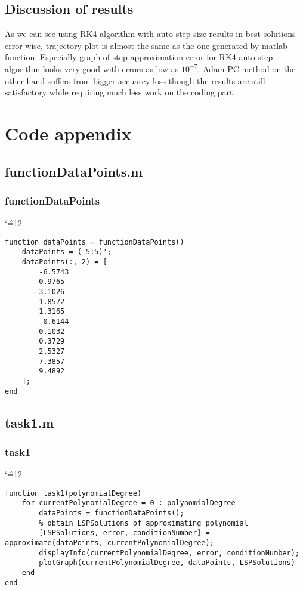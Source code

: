 \documentclass[12pt]{report}
\newenvironment{simplechar}{%
   \catcode`\^=12
}{}
\begin{document}
\section{Discussion of results}
As we can see using RK4 algorithm with auto step size results in best solutions error-wise, trajectory plot is almost the same as the one generated by matlab function. Especially graph of step approximation error for RK4 auto step algorithm looks very good with errors as low as $10^{-7}$. Adam PC method on the other hand suffers from bigger accuarcy loss though the results are still satisfactory while requiring much less work on the coding part.

\chapter{Code appendix}

\section{functionDataPoints.m}
\subsection{functionDataPoints}
\begin{simplechar}
\begin{lstlisting}
function dataPoints = functionDataPoints()
    dataPoints = (-5:5)';
    dataPoints(:, 2) = [
        -6.5743
        0.9765
        3.1026
        1.8572
        1.3165
        -0.6144
        0.1032
        0.3729
        2.5327
        7.3857
        9.4892
    ];
end
\end{lstlisting}
\end{simplechar}

\section{task1.m}
\subsection{task1}
\begin{simplechar}
\begin{lstlisting}
function task1(polynomialDegree)
    for currentPolynomialDegree = 0 : polynomialDegree
        dataPoints = functionDataPoints();
        % obtain LSPSolutions of approximating polynomial
        [LSPSolutions, error, conditionNumber] = approximate(dataPoints, currentPolynomialDegree);
        displayInfo(currentPolynomialDegree, error, conditionNumber);
        plotGraph(currentPolynomialDegree, dataPoints, LSPSolutions)
    end
end
\end{lstlisting}
\end{simplechar}
\end{document}
